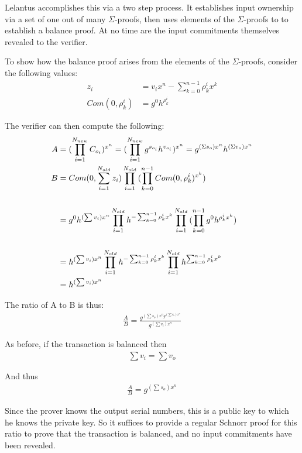 \documentclass{article}
\begin{document}
Lelantus accomplishes this via a two step process.  It establishes input ownership via a set of one out of many $\Sigma$-proofs, then uses elements of the $\Sigma$-proofs to to establish a balance proof.  At no time are the input commitments themselves revealed to the verifier.

To show how the balance proof arises from the elements of the $\Sigma$-proofs, consider the following values:
\begin{align}
  z_i &= v_i x^n - \sum_{k=0}^{n-1}{\rho_k^i x^k}\\
  Com(0, \rho_k^i) &= g^0 h^{\rho_k^i}
\end{align}

The verifier can then compute the following:
\begin{align}
  A &= (\prod_{i=1}^{N_{new}}{C_{o_i}})^{x^n} = (\prod_{i=1}^{N_{new}}{g^{s_{o_i}} h^{v_{o_i}}})^{x^n}  =  g^{(\Sigma s_o) x^n}  h^{(\Sigma v_o) x^n}\\
  B &= Com(0, \sum_{i=1}^{N_{old}}{z_i}) \prod_{i=1}^{N_{old}}{(\prod_{k=0}^{n-1} Com(0, \rho_k^i)^{x^k})}\\
  \cr &= g^0 h^{(\sum{v_i}) x^n} \prod_{i=1}^{N_{old}}{h^{-\sum_{k=0}^{n-1}{\rho_k^i x^k}}} \prod_{i=1}^{N_{old}}{(\prod_{k=0}^{n-1}{g^0 h^{\rho_k^i x^k}})}\\
  \cr &= h^{(\sum{v_i}) x^n} \prod_{i=1}^{N_{old}}{h^{-\sum_{k=0}^{n-1}{\rho_k^i x^k}}}  \prod_{i=1}^{N_{old}}{h^{\sum_{k=0}^{n-1}{\rho_k^i x^k}}}
  \cr &= h^{(\sum{v_i}) x^n}
\end{align}

The ratio of A to B is thus:
\begin{align}
  \frac{A}{B} = \frac{g^{(\sum{s_o}) x^n g^{(\sum{v_o}) x^n}}}{g^{(\sum{v_i}) x^n}}
\end{align}
  
As before, if the transaction is balanced then 
\begin{align}
  \sum{v_i} = \sum{v_o}
\end{align}

And thus
\begin{align}
  \frac{A}{B} = g^{(\sum{s_o}) x^n}
\end{align}

Since the prover knows the output serial numbers, this is a public key to which he knows the private key.  So it suffices to provide a regular Schnorr proof for this ratio to prove that the transaction is balanced, and no input commitments have been revealed.
\end{document}
